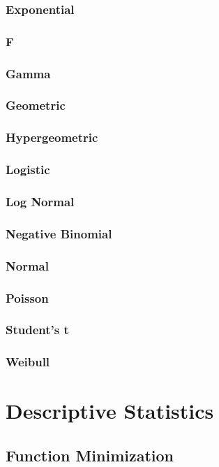 \documentclass[12pt,a4paper]{article}
\begin{document}
\subsubsection{Exponential}
\subsubsection{F}
\subsubsection{Gamma}
\subsubsection{Geometric}
\subsubsection{Hypergeometric}
\subsubsection{Logistic}
\subsubsection{Log Normal}
\subsubsection{Negative Binomial}
\subsubsection{Normal}
\subsubsection{Poisson}
\subsubsection{Student's t}
\subsubsection{Weibull}
\section{Descriptive Statistics}
\subsection{Function Minimization}
\end{document}

